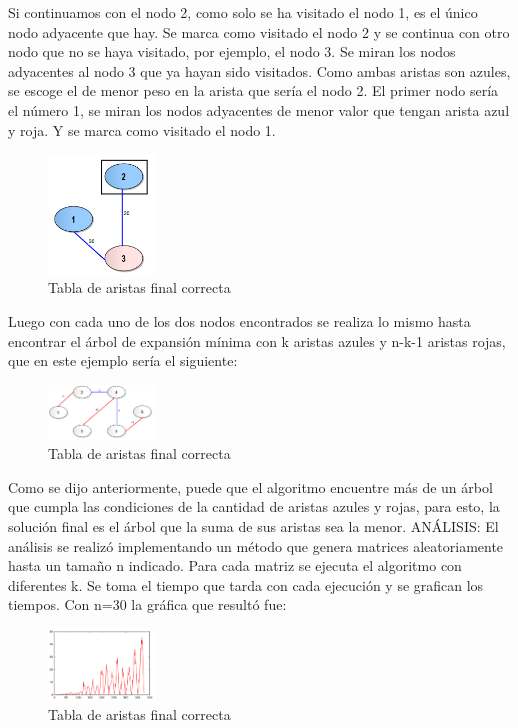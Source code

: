 \documentclass[conference,compsoc]{IEEEtran}
\begin{document}
Si continuamos con el nodo 2, como solo se ha visitado el nodo 1, es el único nodo adyacente que hay. Se marca como visitado el nodo 2 y se continua con otro nodo que no se haya visitado, por ejemplo, el nodo 3. Se miran los nodos adyacentes al nodo 3 que ya hayan sido visitados. Como ambas aristas son azules, se escoge el de menor peso en la arista que sería el nodo 2. 
El primer nodo sería el número 1, se miran los nodos adyacentes de menor valor que tengan arista azul y roja. Y se marca como visitado el nodo 1.
\begin{figure}[h] 
    \centering
    \includegraphics[width=0.25\textwidth]{Problema2/p23.png}
    \caption{Tabla de aristas final correcta}
    \label{fig:mesh1}
\end{figure}
$$$$$$$$$$$$$$$$$$$$$$$$$$$$
Luego con cada uno de los dos nodos encontrados se realiza lo mismo hasta encontrar el árbol de expansión mínima con k aristas azules y n-k-1 aristas rojas, que en este ejemplo sería el siguiente:  
\begin{figure}[h] 
    \centering
    \includegraphics[width=0.25\textwidth]{Problema2/p24.png}
    \caption{Tabla de aristas final correcta}
    \label{fig:mesh1}
\end{figure}

Como se dijo anteriormente, puede que el algoritmo encuentre más de un árbol que cumpla las condiciones de la cantidad de aristas azules y rojas, para esto, la solución final es el árbol que la suma de sus aristas sea la menor.
ANÁLISIS:
El análisis se realizó implementando un método que genera matrices aleatoriamente hasta un tamaño n indicado. Para cada matriz se ejecuta el algoritmo con diferentes k. Se toma el tiempo que tarda con cada ejecución y se grafican los tiempos. Con n=30 la gráfica que resultó fue:
\begin{figure}[h] 
    \centering
    \includegraphics[width=0.25\textwidth]{Problema2/p25.png}
    \caption{Tabla de aristas final correcta}
    \label{fig:mesh1}
\end{figure}
\end{document}
